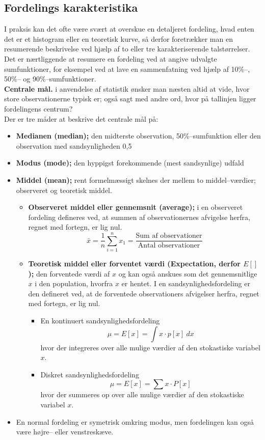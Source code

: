 \documentclass[11pt]{article}
\begin{document}
\subsection{Fordelings karakteristika}
I praksis kan det ofte være svært at overskue en detaljeret fordeling, hvad enten det er et histogram eller en teoretisk kurve, så derfor foretrækker man en resumerende beskrivelse ved hjælp af to eller tre karakteriserende talstørrelser. Det er nærtliggende at resumere en fordeling ved at angive udvalgte sumfunktioner, for eksempel ved at lave en sammenfatning ved hjælp af 10\%--, 50\%-- og 90\%--sumfunktioner.\\[0.2cm]
\textbf{Centrale mål.} i anvendelse af statistik ønsker man næsten altid at vide, hvor store observationerne typisk er; også sagt med andre ord, hvor på tallinjen ligger fordelingens centrum? \\[0.2cm]
Der er tre måder at beskrive det centrale mål på:
\begin{itemize}\itemsep-2pt
\item \textbf{Medianen (median);} den midterste observation, 50\%--sumfunktion eller den observation med sandsynligheden 0,5
\item \textbf{Modus (mode);} den hyppigst forekommende (mest sandsynlige) udfald
\item \textbf{Middel (mean);} rent formelmæssigt skelnes der mellem to middel--værdier; observeret og teoretisk middel.
\begin{itemize}\itemsep-2pt
\item \textbf{Observeret middel eller gennemsnit (average);} i en observeret fordeling defineres ved, at summen af observationernes afvigelse herfra, regnet med fortegn, er lig nul.
$$\bar{x}=\frac{1}{n}\sum^n_{i=1}x_1=\frac{\text{Sum af observationer}}{\text{Antal observationer}}$$
\item \textbf{Teoretisk middel eller forventet værdi (Expectation, derfor $E[]$);} den forventede værdi af $x$ og kan også anskues som det gennemsnitlige $x$ i den population, hvorfra $x$ er hentet. I en sandsynlighedsfordeling er den defineret ved, at de forventede observationers afvigelser herfra, regnet med fortegn, er lig nul. 
\begin{itemize}\itemsep-2pt
\item En kontinuert sandsynlighedsfordeling
$$\mu=E[x]=\int x\cdot p[x]\:dx$$
hvor der integreres over alle mulige værdier af den stokastiske variabel $x$.
\item Diskret sandsynlighedsfordeling
$$\mu=E[x]=\sum x\cdot P[x]$$
hvor der summeres op over alle mulige værdier af den stokastiske variabel $x$. 
\end{itemize}
\end{itemize}
\item En normal fordeling er symetrisk omkring modus, men fordelingen kan også være højre-- eller venstreskæve. 
\end{itemize}
\end{document}
